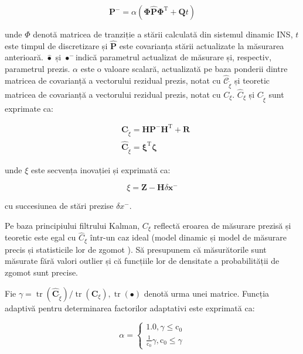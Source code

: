 \documentclass[10pt]{report}
\begin{document}
\begin{equation}
  \boldsymbol{P}^{-}=\alpha\left(\boldsymbol{\Phi} \hat{\boldsymbol{P}} \boldsymbol{\Phi}^{\mathrm{T}}+\boldsymbol{Q} t\right)
\end{equation}

unde $\Phi$ denotă matricea de tranziție a stării calculată din sistemul dinamic INS, $t$ este timpul de discretizare și $\hat{\boldsymbol{P}}$ este covarianța stării actualizate la măsurarea anterioară. $\hat{\bullet}$ și $\bullet^{-}$indică parametrul actualizat de măsurare și, respectiv, parametrul prezis. $\alpha$ este o valoare scalară, actualizată pe baza ponderii dintre matricea de covarianță a vectorului rezidual prezis, notat cu $\hat{\mathcal{C}}_{\tilde{\xi}}$ și teoretic matricea de covarianță a vectorului rezidual prezis, notat cu $C_{\xi}$. $\hat{C}_{\xi}$ și $C_{\tilde{\xi}}$ sunt exprimate ca:

\begin{equation}
  \begin{aligned}
     & \boldsymbol{C}_{\tilde{\xi}}=\boldsymbol{H} \boldsymbol{P}^{-} \boldsymbol{H}^{\mathrm{T}}+\boldsymbol{R} \\
     & \hat{\boldsymbol{C}}_{\tilde{\xi}}=\boldsymbol{\xi}^{\mathrm{T}} \boldsymbol{\zeta}
  \end{aligned}
\end{equation}

unde $\xi$ este secvența inovației și exprimată ca:

\begin{equation}
  \xi=\mathbf{Z}-\mathbf{H} \delta \boldsymbol{x}^{-}
\end{equation}

cu succesiunea de stări prezise $\delta x^{-}$.

Pe baza principiului filtrului Kalman, $C_{\xi}$ reflectă eroarea de măsurare prezisă și teoretic este egal cu $\hat{C}_{\xi}$ într-un caz ideal (model dinamic și model de măsurare precis și statisticile lor de zgomot ). Să presupunem că măsurătorile sunt măsurate fără valori outlier și că funcțiile lor de densitate a probabilității de zgomot sunt precise.

Fie $\gamma=\operatorname{tr}\left(\hat{\boldsymbol{C}}_{\tilde{\xi}}\right) / \operatorname{tr}\left(\boldsymbol{C}_{ \xi}\right), \operatorname{tr}(\bullet)$ denotă urma unei matrice. Funcția adaptivă pentru determinarea factorilor adaptativi este exprimată ca:

\begin{equation}
  \alpha=\left\{\begin{array}{l}
    1.0, \gamma \leq \mathrm{c}_{0} \\
    \frac{1}{\mathrm{c}_{0}} \gamma, \mathrm{c}_{0} \leq \gamma
  \end{array}\right.
\end{equation}
\end{document}

